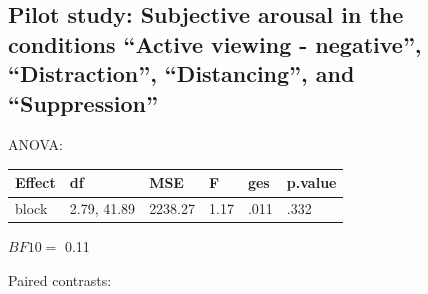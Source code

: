 \documentclass[
  english,
  man,floatsintext]{apa6}
\begin{document}
\hypertarget{pilot-study-subjective-arousal-in-the-conditions-active-viewing---negative-distraction-distancing-and-suppression}{%
\subsection{Pilot study: Subjective arousal in the conditions ``Active viewing - negative'', ``Distraction'', ``Distancing'', and ``Suppression''}\label{pilot-study-subjective-arousal-in-the-conditions-active-viewing---negative-distraction-distancing-and-suppression}}

ANOVA:

\begin{tabular}{l|l|l|l|l|l}
\hline
Effect & df & MSE & F & ges & p.value\\
\hline
block & 2.79, 41.89 & 2238.27 & 1.17 & .011 & .332\\
\hline
\end{tabular}

\(BF10=\) 0.11

Paired contrasts:
\end{document}
